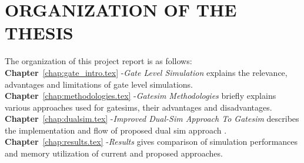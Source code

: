 \section{ORGANIZATION OF THE THESIS}
The organization of this project report is as follows:\\
\noindent 
{\bf Chapter}~\ref{chap:gate_intro.tex} -{\it Gate Level Simulation} explains the relevance, advantages and limitations of gate level simulations.\\
{\bf Chapter}~\ref{chap:methodologies.tex} -{\it Gatesim Methodologies} briefly explains various approaches used for gatesims, their advantages and disadvantages.\\
{\bf Chapter}~\ref{chap:dualsim.tex} -{\it Improved Dual-Sim Approach To Gatesim} describes the implementation and flow of proposed dual sim approach .\\
{\bf Chapter}~\ref{chap:results.tex} -{\it Results} gives comparison of simulation performances and memory utilization of current and proposed approaches.\\

